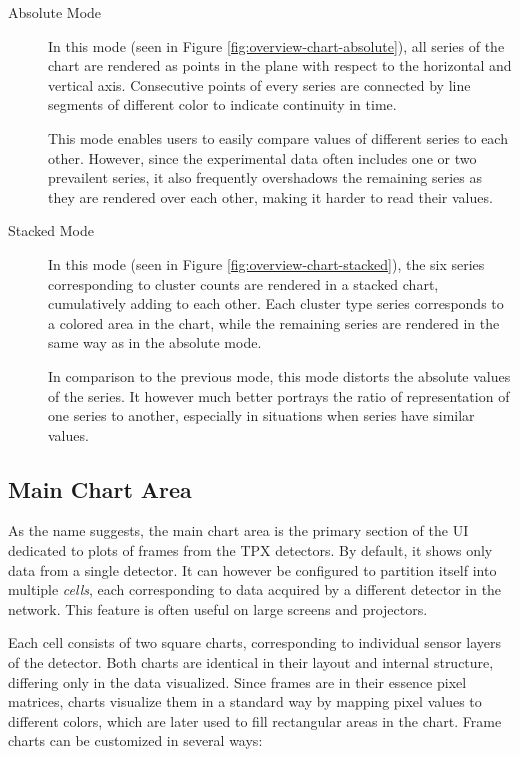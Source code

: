 \begin{description}
	\item[Absolute Mode]
	In this mode (seen in Figure \ref{fig:overview-chart-absolute}), all series of the chart are rendered as points in the plane with respect to the horizontal and vertical axis. Consecutive points of every series are connected by line segments of different color to indicate continuity in time.

	This mode enables users to easily compare values of different series to each other. However, since the experimental data often includes one or two prevailent series, it also frequently overshadows the remaining series as they are rendered over each other, making it harder to read their values.

	\item[Stacked Mode]
	In this mode (seen in Figure \ref{fig:overview-chart-stacked}), the six series corresponding to cluster counts are rendered in a stacked chart, cumulatively adding to each other. Each cluster type series corresponds to a colored area in the chart, while the remaining series are rendered in the same way as in the absolute mode.

	In comparison to the previous mode, this mode distorts the absolute values of the series. It however much better portrays the ratio of representation of one series to another, especially in situations when series have similar values.
\end{description}

\subsection{Main Chart Area}
As the name suggests, the main chart area is the primary section of the UI dedicated to plots of frames from the TPX detectors. By default, it shows only data from a single detector. It can however be configured to partition itself into multiple \textit{cells}, each corresponding to data acquired by a different detector in the network. This feature is often useful on large screens and projectors.

Each cell consists of two square charts, corresponding to individual sensor layers of the detector. Both charts are identical in their layout and internal structure, differing only in the data visualized. Since frames are in their essence pixel matrices, charts visualize them in a standard way by mapping pixel values to different colors, which are later used to fill rectangular areas in the chart. Frame charts can be customized in several ways:

